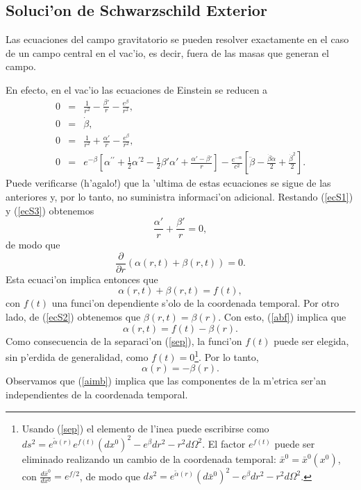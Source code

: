 \subsection{Soluci'on de Schwarzschild Exterior}

Las ecuaciones del campo gravitatorio se pueden resolver exactamente en
el caso de un campo central en el vac'io, es decir, fuera de las masas que
generan el campo.

En efecto, en el vac'io las ecuaciones de Einstein se reducen a
\begin{eqnarray}
0&=& \frac{1}{r^2}-\frac{\beta'}{r}-\frac{e^\beta}{r^2}, \label{ecS1}\\
0&=& \dot{\beta}, \label{ecS2}\\
0&=& \frac{1}{r^2}+\frac{\alpha'}{r}-\frac{e^\beta}{r^2}, \label{ecS3}\\
0&=& e^{-\beta} \left[\alpha^{\prime\prime}+\frac{1}2\alpha^{\prime2}
-\frac{1}2\beta'\alpha'+\frac{ \alpha'-\beta'}{r}\right] -\frac{e^{-\alpha}}{c^2} \left[
\ddot{\beta}-\frac{\dot{\beta}\dot{\alpha}}2+\frac{\dot{\beta}^2}2\right].
\label{ecS4}
\end{eqnarray}
Puede verificarse (h'agalo!) que la 'ultima de estas ecuaciones se sigue de las
anteriores y, por lo tanto, no suministra informaci'on adicional. Restando
(\ref{ecS1}) y (\ref{ecS3}) obtenemos
\begin{equation}
 \frac{\alpha'}{r}+\frac{\beta'}{r} =0,
\end{equation}
de modo que
\begin{equation}
\frac{\partial}{\partial r}\left( \alpha(r,t) +\beta(r,t) \right)
 =0.
\end{equation}
Esta ecuaci'on implica entonces que
\begin{equation}
\alpha(r,t) +\beta(r,t) =f(t), \label{abf}
\end{equation}
con $f(t)$ una funci'on dependiente s'olo de la coordenada temporal. Por otro
lado, de (\ref{ecS2}) obtenemos que $\beta(r,t) =\beta(r)$. Con esto,
(\ref{abf}) implica que
\begin{equation}
\alpha(r,t) =f(t)-\beta(r). \label{sep}
\end{equation}
Como consecuencia de la separaci'on (\ref{sep}), la funci'on $f(t)$
puede ser elegida, sin p'erdida de generalidad, como $f(t)=0$\footnote{Usando
(\ref{sep}) el elemento de l'inea puede escribirse como
$ds^2=e^{\tilde\alpha(r)}e^{f(t)}(dx^0)^2-e^\beta dr^2-r^2d\Omega^2$. El factor
$e^{f(t)}$ puede ser eliminado realizando un cambio de la coordenada
temporal: $\bar{x}^0=\bar{x}^0(x^0)$, con $\frac{d\bar{x}^0}{dx^0}=e^{f/2}$, de
modo que $ds^2=e^{\tilde\alpha(r)}(d\bar{x}^0)^2-e^\beta dr^2-r^2d\Omega^2$.}.
Por lo tanto,
\begin{equation}
 \alpha(r)=-\beta(r). \label{aimb}
\end{equation}
Observamos que (\ref{aimb}) implica que las componentes de la m'etrica ser'an
independientes de la coordenada temporal.

